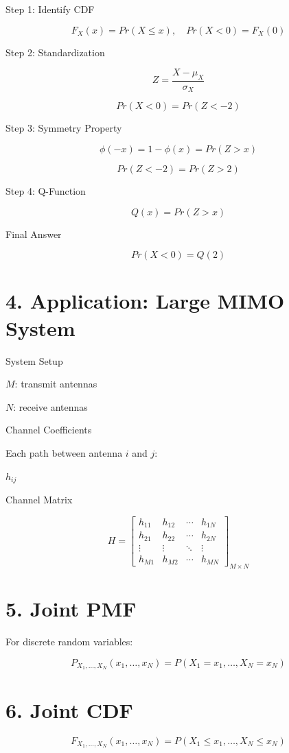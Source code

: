 \documentclass[12pt]{article}
\begin{document}
Step 1: Identify CDF

\[
F_X(x)=Pr(X\le x),\quad Pr(X<0)=F_X(0)
\]

Step 2: Standardization

\[
Z=\frac{X-\mu_X}{\sigma_X}
\]

\[
Pr(X<0)=Pr(Z<-2)
\]

Step 3: Symmetry Property

\[
\phi(-x)=1-\phi(x)=Pr(Z>x)
\]

\[
Pr(Z<-2)=Pr(Z>2)
\]

Step 4: Q-Function

\[
Q(x)=Pr(Z>x)
\]

Final Answer

\[
Pr(X<0)=Q(2)
\]

\section*{4. Application: Large MIMO System}

System Setup

$M$: transmit antennas

$N$: receive antennas

Channel Coefficients

Each path between antenna $i$ and $j$:

$h_{ij}$

Channel Matrix

\[
H =
\begin{bmatrix}
h_{11} & h_{12} & \cdots & h_{1N} \\
h_{21} & h_{22} & \cdots & h_{2N} \\
\vdots & \vdots & \ddots & \vdots \\
h_{M1} & h_{M2} & \cdots & h_{MN}
\end{bmatrix}_{M\times N}
\]

\section*{5. Joint PMF}

For discrete random variables:

\[
P_{X_1,\dots,X_N}(x_1,\dots,x_N)=
P(X_1=x_1,\dots,X_N=x_N)
\]

\section*{6. Joint CDF}

\[
F_{X_1,\dots,X_N}(x_1,\dots,x_N)=
P(X_1\le x_1,\dots,X_N\le x_N)
\]
\end{document}
